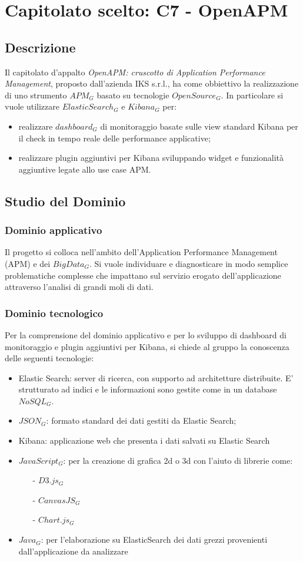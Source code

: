 \newpage
\section{Capitolato scelto: C7 - OpenAPM}
	\subsection{Descrizione}
	Il capitolato d'appalto \emph{OpenAPM: cruscotto di Application Performance Management},  proposto dall'azienda IKS s.r.l., ha come obbiettivo la realizzazione di uno strumento $APM_G$ basato su tecnologie $Open Source_G$. In particolare si vuole utilizzare $Elastic Search_G$ e $Kibana_G$ per:
	\begin{itemize}
		\item realizzare $dashboard_G$ di monitoraggio  basate sulle view standard Kibana per il check in tempo reale delle performance applicative;
		\item realizzare plugin aggiuntivi per Kibana sviluppando widget e funzionalità aggiuntive legate allo use case APM. 
	\end{itemize}
	
	\subsection{Studio del Dominio}
		\subsubsection{Dominio applicativo}
		Il progetto si colloca nell'ambito dell'Application Performance Management (APM) e dei $Big Data_G$. Si vuole individuare e diagnosticare in modo semplice problematiche complesse che impattano sul servizio erogato dell'applicazione attraverso l'analisi di grandi moli di dati.
		\subsubsection{Dominio tecnologico}
		Per la comprensione del dominio applicativo e per lo sviluppo di dashboard di monitoraggio e plugin aggiuntivi per Kibana, si chiede al gruppo la conoscenza delle seguenti tecnologie:
		\begin{itemize}
			\item Elastic Search: server di ricerca, con supporto ad architetture distribuite. E' strutturato ad indici e le informazioni sono gestite come in un database $NoSQL_G$.
			\item $JSON_G$: formato standard dei dati gestiti da Elastic Search;
			\item Kibana: applicazione web che presenta i dati salvati su Elastic Search
			\item $JavaScript_G$: per la creazione di grafica 2d o 3d con l'aiuto di librerie come:
			\begin{itemize}
				\item[-] $D3.js_G$
				\item[-] $CanvasJS_G$
				\item[-] $Chart.js_G$
			\end{itemize}
			\item $Java_G$: per l'elaborazione su ElasticSearch dei dati grezzi provenienti dall'applicazione da analizzare
		\end{itemize}
